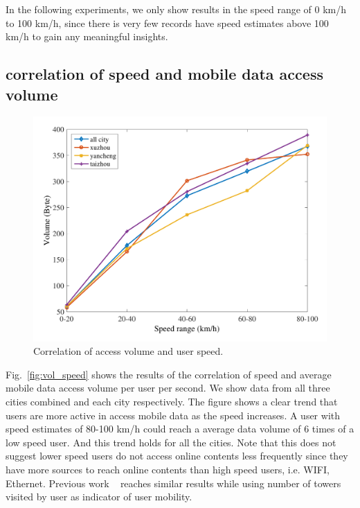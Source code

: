 In the following experiments, we only show results in the speed range of 0 km/h to 100 km/h, since there is very few records have speed estimates above 100 km/h to gain any meaningful insights. 

\subsection{correlation of speed and mobile data access volume}

\begin{figure}[h]
    \centering
    \includegraphics[width=\linewidth]{./figures/speed_vol.pdf}
    \caption{Correlation of access volume and user speed.}
    \label{fig:speed_vol}
\end{figure}

Fig.~\ref{fig:vol_speed} shows the results of the correlation of speed and average mobile data access volume per user per second. We show data from all three cities combined and each city respectively. The figure shows a clear trend that users are more active in access mobile data as the speed increases.
A user with speed estimates of 80-100 km/h could reach a average data volume of 6 times of a low speed user. And this trend holds for all the cities. Note that this does not suggest lower speed users do not access online contents less frequently since they have more sources to reach online contents than high speed users, i.e. WIFI, Ethernet. Previous work ~\cite{yang2015characterizing} reaches similar results while using number of towers visited by user as indicator of user mobility.

